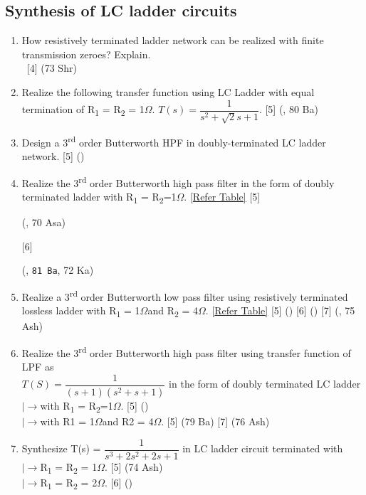 \documentclass[12pt]{article}
\newcommand{\W}{\(\Omega\)}
\newcommand{\lb}{\\$\left|\rightarrow\right.$}
\newcommand{\enter}{\\\textcolor{white}{1}}
\newcommand{\sub}[1]{\textsubscript{#1}}
\newcommand{\super}[1]{\textsuperscript{#1}}
\begin{document}
	\subsection{Synthesis of LC ladder circuits }
		\begin{enumerate}
			\item How resistively terminated ladder network can be realized with finite transmission zeroes? Explain.
			\enter\hfill [4] (73 Shr)

			\item Realize the following transfer function using LC Ladder with equal termination of R\sub{1} = R\sub{2} = 1\W. $T(s) = \dfrac{1}{s^2+\sqrt{2}s+1}$. \hfill [5] (, 80 Ba)
			
			\item Design a 3\super{rd} order Butterworth HPF in doubly-terminated LC ladder network. \hfill [5] ()
			
			\item Realize the 3\super{rd} order Butterworth high pass filter in the form of doubly terminated ladder with R\sub{1} = R\sub{2}=1\W. {[\hyperref[sec:tables_81ba]{Refer Table]}} \hfill [5] \begin{footnotesize} (, 70 Asa) \end{footnotesize} [6] \begin{footnotesize} (, \texttt{81 Ba}, 72 Ka) \end{footnotesize}

			\item Realize a 3\super{rd} order Butterworth low pass filter using resistively terminated lossless ladder with R\sub{1} = 1\W and R\sub{2} = 4\W. {[\hyperref[sec:tables_81ba]{Refer Table]}} \hfill [5] () [6] () [7] (, 75 Ash)

			\item Realize the 3\super{rd} order Butterworth high pass filter using transfer function of LPF as\\ $T(S)= \dfrac{1}{(s+1)(s^2+s+1)}$ in the form of doubly terminated LC ladder
			\lb with R\sub{1} = R\sub{2}=1\W. \hfill [5] ()
			\lb with R1 = 1\W and R2 = 4\W.  \hfill [5] (79 Ba)	[7] (76 Ash)
			
			\item Synthesize T(s) = $\dfrac{1}{s^3+2s^2+2s+1}$ in LC ladder circuit terminated with
			\lb R\sub{1} = R\sub{2} = 1\W. \hfill [5] (74 Ash)
			\lb R\sub{1} = R\sub{2} = 2\W. \hfill [6] ()
		\end{enumerate}
\end{document}
